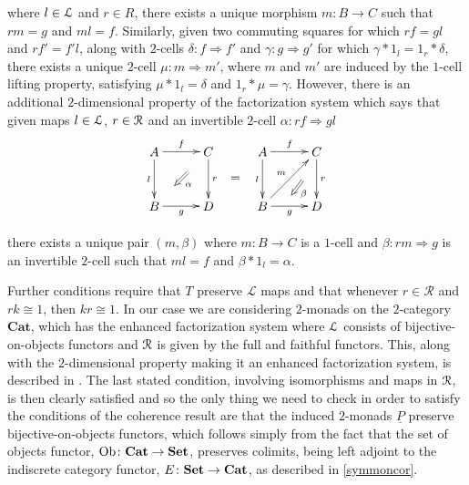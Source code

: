 where $l \in \mathcal{L}$ and $r \in {R}$, there exists a unique morphism $m \colon B \rightarrow C$ such that $rm = g$ and $ml = f$. Similarly, given two commuting squares for which $rf = gl$ and $rf' = f'l$, along with $2$-cells $\delta \colon f \Rightarrow f'$ and $\gamma \colon g \Rightarrow g'$ for which $\gamma \ast 1_l = 1_r \ast \delta$, there exists a unique $2$-cell $\mu \colon m \Rightarrow m'$, where $m$ and $m'$ are induced by the $1$-cell lifting property, satisfying $\mu \ast 1_l = \delta$ and $1_r \ast \mu = \gamma$. However, there is an additional $2$-dimensional property of the factorization system which says that given maps $l \in \mathcal{L}$, $r \in \mathcal{R}$ and an invertible $2$-cell $\alpha \colon rf \Rightarrow gl$
    \[
        \xy
            (0,0)*+{A}="00";
            (15,0)*+{C}="10";
            (0,-15)*+{B}="01";
            (15,-15)*+{D}="11";
            {\ar^{f} "00" ; "10"};
            {\ar^{r} "10" ; "11"};
            {\ar_{l} "00" ; "01"};
            {\ar_{g} "01" ; "11"};
            {\ar@{=>}^{\alpha} (9.375,-5.625) ; (5.625,-9.375)};
            (22.5,-7.5)*+{=};
            (30,0)*+{A}="20";
            (45,0)*+{C}="30";
            (30,-15)*+{B}="21";
            (45,-15)*+{D}="31";
            {\ar^{f} "20" ; "30"};
            {\ar^{r} "30" ; "31"};
            {\ar_{l} "20" ; "21"};
            {\ar_{g} "21" ; "31"};
            {\ar^{m} "21" ; "30"};
            {\ar@{=>}^{\beta} (41,-8) ; (38,-12)};
        \endxy
    \]

there exists a unique pair $(m,\beta)$ where $m \colon B \rightarrow C$ is a $1$-cell and $\beta \colon rm \Rightarrow g$ is an invertible $2$-cell such that $ml = f$ and $\beta \ast 1_{l} = \alpha$.

Further conditions require that $T$ preserve $\mathcal{L}$ maps and that whenever $r \in \mathcal{R}$ and $rk \cong 1$, then $kr \cong 1$. In our case we are considering $2$-monads on the $2$-category $\mathbf{Cat}$, which has the enhanced factorization system where $\mathcal{L}$ consists of bijective-on-objects functors and $\mathcal{R}$ is given by the full and faithful functors. This, along with the $2$-dimensional property making it an enhanced factorization system, is described in \cite{power-gen}. The last stated condition, involving isomorphisms and maps in $\mathcal{R}$, is then clearly satisfied and so the only thing we need to check in order to satisfy the conditions of the coherence result are that the induced $2$-monads $\underline{P}$ preserve bijective-on-objects functors, which follows simply from the fact that the set of objects functor, $\operatorname{Ob} \colon \mathbf{Cat} \rightarrow \mathbf{Set}$, preserves colimits, being left adjoint to the indiscrete category functor, $E \colon \mathbf{Set} \rightarrow \mathbf{Cat}$, as described in \cref{symmoncor}.

